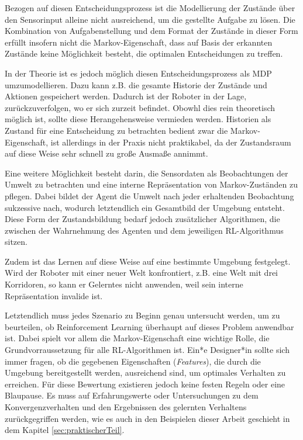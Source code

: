 Bezogen auf diesen Entscheidungsprozess ist die Modellierung der Zustände über den Sensorinput alleine nicht ausreichend, um die gestellte Aufgabe zu lösen. Die Kombination von Aufgabenstellung und dem Format der Zustände in dieser Form erfüllt insofern nicht die Markov-Eigenschaft, dass auf Basis der erkannten Zustände keine Möglichkeit besteht, die optimalen Entscheidungen zu treffen. 
\par

In der Theorie ist es jedoch möglich diesen Entscheidungsprozess als MDP umzumodellieren.
Dazu kann z.B. die gesamte Historie der Zustände und Aktionen gespeichert werden. Dadurch ist der Roboter in der Lage, zurückzuverfolgen, wo er sich zurzeit befindet. Obowhl dies rein theoretisch möglich ist, sollte diese Herangehensweise vermieden werden. Historien als Zustand für eine Entscheidung zu betrachten bedient zwar die Markov-Eigenschaft, ist allerdings in der Praxis nicht praktikabel, da der Zustandsraum auf diese Weise sehr schnell zu große Ausmaße annimmt.
\par 
Eine weitere Möglichkeit besteht darin, die Sensordaten als Beobachtungen der Umwelt zu betrachten und eine interne Repräsentation von Markov-Zuständen zu pflegen. Dabei bildet der Agent die Umwelt nach jeder erhaltenden Beobachtung suk­zes­si­ve nach, wodurch letztendlich ein Gesamtbild der Umgebung entsteht. Diese Form der Zustandsbildung bedarf jedoch zusätzlicher Algorithmen, die zwischen der Wahrnehmung des Agenten und dem jeweiligen RL-Algorithmus sitzen. 
\par 
Zudem ist das Lernen auf diese Weise auf eine bestimmte Umgebung festgelegt. Wird der Roboter mit einer neuer Welt konfrontiert, z.B. eine Welt mit drei Korridoren, so kann er Gelerntes nicht anwenden, weil sein interne Repräsentation invalide ist.
\par 
Letztendlich muss jedes Szenario zu Beginn genau untersucht werden, um zu beurteilen, ob Reinforcement Learning überhaupt auf dieses Problem anwendbar ist. Dabei spielt vor allem die Markov-Eigenschaft eine wichtige Rolle, die Grundvorraussetzung für alle RL-Algorithmen ist. Ein*e Designer*in sollte sich immer fragen, ob die gegebenen Eigenschaften (\textit{Features}), die durch die Umgebung bereitgestellt werden, ausreichend sind, um optimales Verhalten zu erreichen. Für diese Bewertung existieren jedoch keine festen Regeln oder eine Blaupause. Es muss auf Erfahrungswerte oder Untersuchungen zu dem Konvergenzverhalten und den Ergebnissen des gelernten Verhaltens zurückgegriffen werden, wie es auch in den Beispielen dieser Arbeit geschieht in dem Kapitel \ref{sec:praktischerTeil}.

